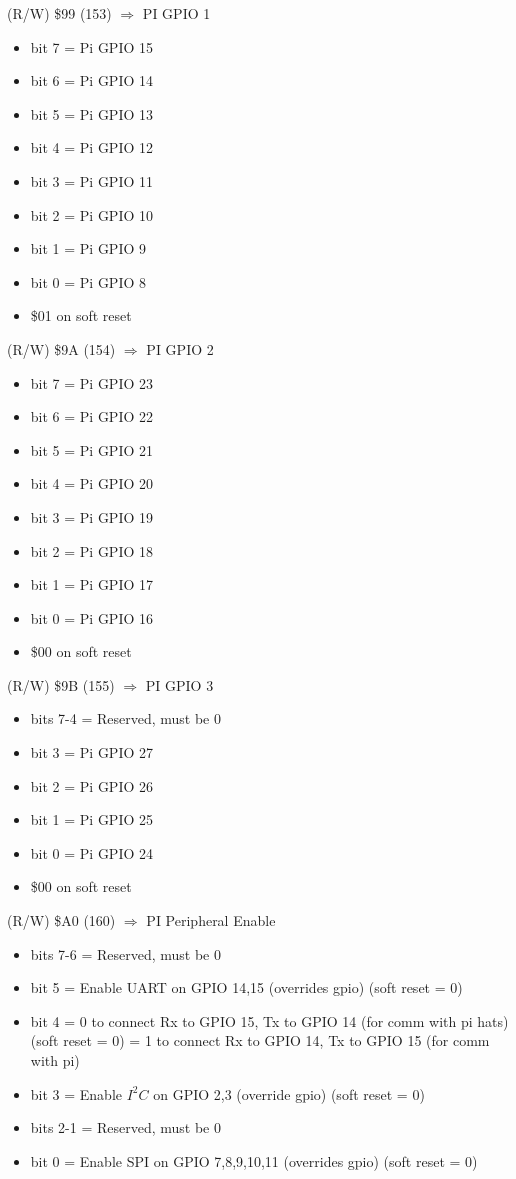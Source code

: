(R/W) \$99 (153) $\Rightarrow$ PI GPIO 1
\begin{itemize}
\item bit 7 = Pi GPIO 15
\item bit 6 = Pi GPIO 14
\item bit 5 = Pi GPIO 13
\item bit 4 = Pi GPIO 12
\item bit 3 = Pi GPIO 11
\item bit 2 = Pi GPIO 10
\item bit 1 = Pi GPIO 9
\item bit 0 = Pi GPIO 8
\item[] \$01 on soft reset
\end{itemize}

(R/W) \$9A (154) $\Rightarrow$ PI GPIO 2
\begin{itemize}
\item bit 7 = Pi GPIO 23
\item bit 6 = Pi GPIO 22
\item bit 5 = Pi GPIO 21
\item bit 4 = Pi GPIO 20
\item bit 3 = Pi GPIO 19
\item bit 2 = Pi GPIO 18
\item bit 1 = Pi GPIO 17
\item bit 0 = Pi GPIO 16
\item[] \$00 on soft reset
\end{itemize}

(R/W) \$9B (155) $\Rightarrow$ PI GPIO 3
\begin{itemize}
\item bits 7-4 = Reserved, must be 0
\item bit 3 = Pi GPIO 27
\item bit 2 = Pi GPIO 26
\item bit 1 = Pi GPIO 25
\item bit 0 = Pi GPIO 24
\item[] \$00 on soft reset
\end{itemize}

(R/W) \$A0 (160) $\Rightarrow$ PI Peripheral Enable
\begin{itemize}
\item bits 7-6 = Reserved, must be 0
\item bit 5 = Enable UART on GPIO 14,15 (overrides gpio) (soft reset
  = 0)
\item bit 4 = 0 to connect Rx to GPIO 15, Tx to GPIO 14 (for comm
  with pi hats) (soft reset = 0) = 1 to connect Rx to GPIO 14, Tx to
  GPIO 15 (for comm with pi)
\item bit 3 = Enable $I^2C$ on GPIO 2,3 (override gpio) (soft reset =
  0)
\item bits 2-1 = Reserved, must be 0
\item bit 0 = Enable SPI on GPIO 7,8,9,10,11 (overrides gpio) (soft
  reset = 0)
\end{itemize}

